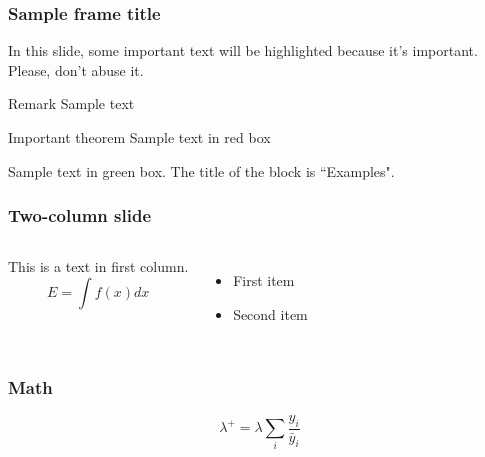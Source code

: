 \documentclass[8pt,aspectratio=169,xcolor=dvipsnames]{beamer} %
\begin{document}
\begin{frame}
\frametitle{Sample frame title}

In this slide, some important text will be
\alert{highlighted} because it's important.
Please, don't abuse it.

\begin{block}{Remark}
Sample text
\end{block}

\begin{alertblock}{Important theorem}
Sample text in red box
\end{alertblock}

\begin{examples}
Sample text in green box. The title of the block is ``Examples".
\end{examples}
\end{frame}


\begin{frame}
\frametitle{Two-column slide}

\begin{columns}

This is a text in first column.
$$E=\int f(x) dx$$
\begin{itemize}
\item First item
\item Second item
\end{itemize}


\begin{center}

\end{center}

\end{columns}
\end{frame}

\begin{frame}
\frametitle{Math}

\begin{equation}
    \lambda^+ = \lambda \sum_i \frac{y_i}{\bar{y}_i}
\end{equation}

\end{frame}
\end{document}
